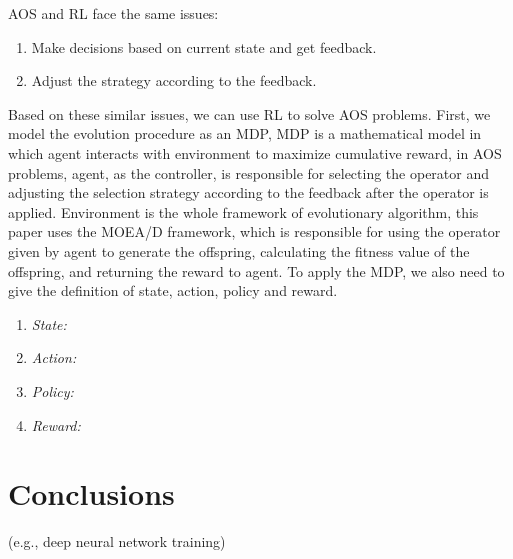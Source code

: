 \documentclass[journal]{IEEEtran}
\begin{document}
AOS and RL face the same issues:
\begin{enumerate}
  \item Make decisions based on current state and get feedback.
  \item Adjust the strategy according to the feedback.
\end{enumerate}
Based on these similar issues, we can use RL to solve AOS problems.
First, we model the evolution procedure as an MDP,
MDP is a mathematical model in which agent interacts with environment to maximize cumulative reward, in AOS problems, agent, as the controller, is responsible for selecting the operator and adjusting the selection strategy according to the feedback after the operator is applied.
Environment is the whole framework of evolutionary algorithm, this paper uses the MOEA/D framework, which is responsible for using the operator given by agent to generate the offspring, calculating the fitness value of the offspring, and returning the reward to agent.
To apply the MDP, we also need to give the definition of state, action, policy and reward.
\begin{enumerate}
  \item \textit{State:}
  \item \textit{Action:}
  \item \textit{Policy:}
  \item \textit{Reward:}
\end{enumerate}





\section{Conclusions}


 (e.g., deep neural network training)

\ifCLASSOPTIONcaptionsoff
  \newpage
\fi



\end{document}
